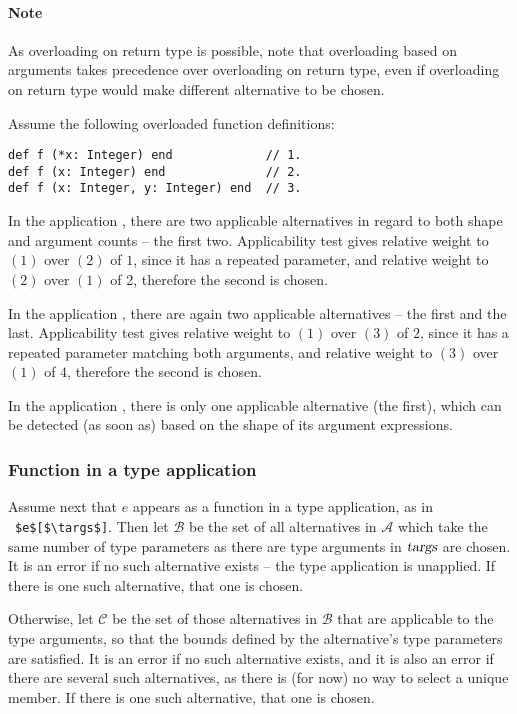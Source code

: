 \paragraph{Note}
As overloading on return type is possible, note that overloading based on arguments takes precedence over overloading on return type, even if overloading on return type would make different alternative to be chosen. 

\example Assume the following overloaded function definitions:
\begin{lstlisting}
def f (*x: Integer) end             // 1.
def f (x: Integer) end              // 2.
def f (x: Integer, y: Integer) end  // 3.
\end{lstlisting}

In the application , there are two applicable alternatives in regard to both shape and argument counts -- the first two. Applicability test gives relative weight to $(1)$ over $(2)$ of $1$, since it has a repeated parameter, and relative weight to $(2)$ over $(1)$ of 2, therefore the second is chosen. 

In the application , there are again two applicable alternatives -- the first and the last. Applicability test gives relative weight to $(1)$ over $(3)$ of $2$, since it has a repeated parameter matching both arguments, and relative weight to $(3)$ over $(1)$ of $4$, therefore the second is chosen. 

In the application , there is only one applicable alternative (the first), which can be detected (as soon as) based on the shape of its argument expressions. 

\subsubsection{Function in a type application}

Assume next that $e$ appears as a function in a type application, as in ~\lstinline!$e$[$\targs$]!. Then let $\mathcal{B}$ be the set of all alternatives in $\mathcal{A}$ which take the same number of type parameters as there are type arguments in $\mbox{\sl targs}$ are chosen. It is an error if no such alternative exists -- the type application is unapplied. If there is one such alternative, that one is chosen. 

Otherwise, let $\mathcal{C}$ be the set of those alternatives in $\mathcal{B}$ that are applicable to the type arguments, so that the bounds defined by the alternative's type parameters are satisfied. It is an error if no such alternative exists, and it is also an error if there are several such alternatives, as there is (for now) no way to select a unique member. If there is one such alternative, that one is chosen. 

